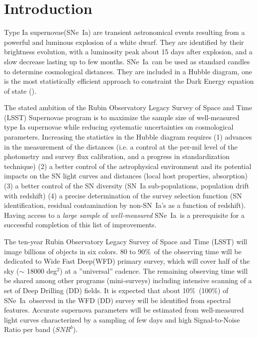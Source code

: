 \documentclass[skiphelvet,twocolumn]{aastex63}
\newcommand{\snrb}{\mbox{$SNR^b$}}
\newcommand{\sne}{{SNe~Ia}}
\newcommand{\degsq}{{deg$^2$}}
\newcommand{\per}{$\%$}
\begin{document}



\section{Introduction}
\label{sec:intro}
Type Ia supernovae(\sne) are transient astronomical events resulting from a powerful and luminous explosion of a white dwarf. They are identified by their brightness evolution, with a luminosity peak about 15 days after explosion, and a slow decrease lasting up to few months. \sne~can be used as standard candles to determine cosmological distances. They are included in a Hubble diagram, one is the most statistically efficient approach to constraint the Dark Energy equation of state (\citealt{Betoule_2014,Scolnic_2018}).
\par
The stated ambition of the Rubin Observatory Legacy Survey of Space and Time (LSST) Supernovae program is to maximize the sample size of well-measured type Ia supernovae while reducing systematic uncertainties on cosmological parameters. Increasing the statistics in the Hubble diagram requires (1) advances in the measurement of the distances (i.e.  a control at the per-mil level of the photometry and survey flux calibration, and a progress in standardization technique) (2) a better control of the astrophysical environment and its potential impacts on the SN light curves and distances (local host properties, absorption) (3) a better control of the SN diversity (SN~Ia sub-populations, population drift with redshift) (4) a precise determination of the survey selection function (SN identification, residual contamination by non-SN~Ia's as a function of redshift). Having access to a {\it large sample} of {\it well-measured} \sne~is a prerequisite for a successful completion of this list of improvements.
\par
The ten-year Rubin Observatory Legacy Survey of Space and Time (LSST) will image billions of objects in six colors. 80 to 90\per~of the observing time will be dedicated to Wide Fast Deep(WFD) primary survey, which will cover half of the sky ($\sim$ 18000 \degsq) at a ''universal'' cadence. The remaining observing time will be shared among other programs (mini-surveys) including intensive scanning of a set of Deep Drilling (DD) fields. It is expected that about 10\per~(100\per) of \sne~observed in the WFD (DD) survey will be identified from spectral features. Accurate supernova parameters will be estimated from well-measured light curves characterized by a sampling of few days and high Signal-to-Noise Ratio per band (\snrb).  %
\end{document}

